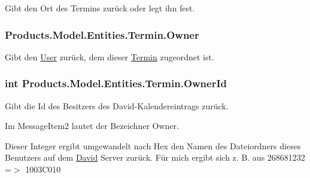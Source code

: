 Gibt den Ort des Termins zurück oder legt ihn fest. 

\subsubsection[{\texorpdfstring{Owner}{Owner}}]{ Products.\+Model.\+Entities.\+Termin.\+Owner\hspace{0.3cm}{\ttfamily [get]}}\hypertarget{class_products_1_1_model_1_1_entities_1_1_termin_a7c583e59c15f0828f152d25d5b127459}{}\label{class_products_1_1_model_1_1_entities_1_1_termin_a7c583e59c15f0828f152d25d5b127459}


Gibt den \hyperlink{class_products_1_1_model_1_1_entities_1_1_user}{User} zurück, dem dieser \hyperlink{class_products_1_1_model_1_1_entities_1_1_termin}{Termin} zugeordnet ist. 

\subsubsection[{\texorpdfstring{Owner\+Id}{OwnerId}}]{\setlength{\rightskip}{0pt plus 5cm}int Products.\+Model.\+Entities.\+Termin.\+Owner\+Id\hspace{0.3cm}{\ttfamily [get]}}\hypertarget{class_products_1_1_model_1_1_entities_1_1_termin_a701661448736a689346c0cf7a3b965b7}{}\label{class_products_1_1_model_1_1_entities_1_1_termin_a701661448736a689346c0cf7a3b965b7}


Gibt die Id des Besitzers des David-\/\+Kalendereintrags zurück. 

Im Message\+Item2 lautet der Bezeichner \textquotesingle{}Owner\textquotesingle{}.

Dieser Integer ergibt umgewandelt nach Hex den Namen des Dateiordners dieses Benutzers auf dem \hyperlink{namespace_david}{David} Server zurück. Für mich ergibt sich z. B. aus 268681232 =$>$ 1003\+C010 
